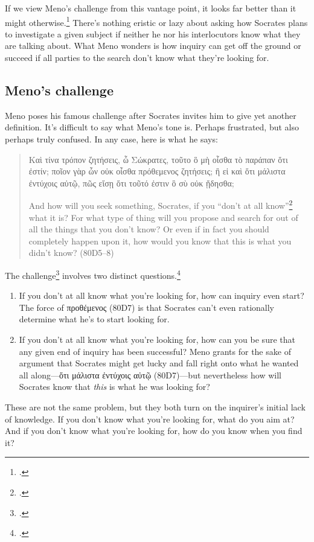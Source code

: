 If we view Meno's challenge from this vantage point, it looks far better than it might otherwise.\footcite[3 and 7]{nehamas1985} There's nothing eristic or lazy about asking how Socrates plans to investigate a given subject if neither he nor his interlocutors know what they are talking about. What Meno wonders is how inquiry can get off the ground or succeed if all parties to the search don't know what they're looking for.

\subsection{Meno's challenge}

Meno poses his famous challenge after Socrates invites him to give yet another definition. It's difficult to say what Meno's tone is. Perhaps frustrated, but also perhaps truly confused. In any case, here is what he says:

\begin{quote}
    {\g
    Καὶ τίνα τρόπον ζητήσεις, ὦ Σώκρατες, τοῦτο ὃ μὴ οἶσθα τὸ παράπαν ὅτι ἐστίν; ποῖον γὰρ ὧν οὐκ οἶσθα πρόθεμενος ζητήσεις; ἢ εἰ καὶ ὅτι μάλιστα ἐντύχοις αὐτῷ, πῶς εἴσῃ ὅτι τοῦτό ἐστιν ὃ σὺ οὐκ ᾔδησθα;
    }

    And how will you seek something, Socrates, if you ``don't at all know''\footcite[I've quoted this following Adam Beresford's translation in][because Meno appears to be throwing back at Socrates something that Socrates said at the start of the dialogue (71B1--8)]{protagorasmeno2005} what it is? For what type of thing will you propose and search for out of all the things that you don't know? Or even if in fact you should completely happen upon it, how would you know that this is what you didn't know? (80D5--8)
\end{quote}

The challenge\footcites[Most people call it a paradox, but for the reasons given by][I think it's better to call it a challenge.]{moline1969}[See, however,][25--27 for support of the term `paradox']{fine2014} involves two distinct questions.\footcite[][in Chapter 7, distinguishes between these as the problems of inquiry and discovery]{scott2006}

\begin{enumerate}
    \item If you don't at all know what you're looking for, how can inquiry even start? The force of {\g προθέμενος} (80D7) is that Socrates can't even rationally determine what he's to start looking for.
    \item If you don't at all know what you're looking for, how can you be sure that any given end of inquiry has been successful? Meno grants for the sake of argument that Socrates might get lucky and fall right onto what he wanted all along—{\g ὅτι μάλιστα ἐντύχοις αὐτῷ} (80D7)—but nevertheless how will Socrates know that \textit{this} is what he was looking for?
\end{enumerate}
These are not the same problem, but they both turn on the inquirer's initial lack of knowledge. If you don't know what you're looking for, what do you aim at? And if you don't know what you're looking for, how do you know when you find it?

